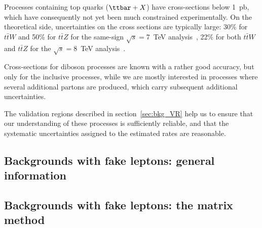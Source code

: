 Processes containing top quarks ($\ttbar + X$) have cross-sections below 1~pb, which have consequently not yet been much constrained experimentally. On the theoretical side, uncertainties on the cross sections are typically large: 30\% for $t\bar{t}W$ and 50\% for $t\bar{t}Z$ for the same-sign $\sqrt{s}=7$~TeV analysis~\cite{NoteSS3L_7TeV}, 22\% for both $t\bar{t}W$ and $t\bar{t}Z$ for the $\sqrt{s}=8$~TeV analysis~\cite{noteSS3L}. 

Cross-sections for diboson processes are known with a rather good accuracy, but only for the inclusive processes, 
while we are mostly interested in processes where several additional partons are produced, 
which carry subsequent additional uncertainties. 

The validation regions described in section~\ref{sec:bkg_VR} help us to ensure that our understanding of these processes is sufficiently reliable, and that the systematic uncertainties assigned to the estimated rates are reasonable. 

%

\subsection{Backgrounds with fake leptons: general information}
\label{sec:bkg_fakes} 


\subsection{Backgrounds with fake leptons: the matrix method}
\label{sec:bkg_matrix_method}


